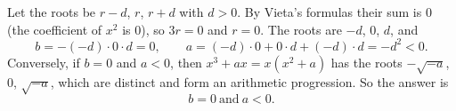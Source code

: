 Let the roots be $r-d$, $r$, $r+d$ with $d>0$. By Vieta's formulas their sum is $0$ (the coefficient of $x^2$ is $0$), so $3r=0$ and $r=0$. The roots are $-d$, $0$, $d$, and
\[b=-(-d)\cdot0\cdot d=0,\qquad a=(-d)\cdot0+0\cdot d+(-d)\cdot d=-d^2<0.\]
Conversely, if $b=0$ and $a<0$, then $x^3+ax=x\left(x^2+a\right)$ has the roots $-\sqrt{-a}$, $0$, $\sqrt{-a}$, which are distinct and form an arithmetic progression. So the answer is
\[\boxed{b=0\ \text{and}\ a<0}.\]
